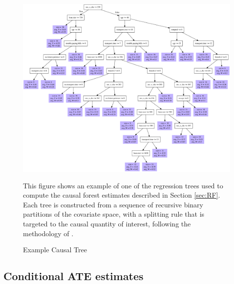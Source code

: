\vspace{.3in}
\begin{figure}[H]
        \caption{Example Causal Tree}
    \label{causal_tree1}
    \begin{center}
        \centering
        \includegraphics[width=\textwidth]{Figuras/crf_apr.pdf}
    \end{center}
    \footnotesize 
    This figure shows an example of one of the regression trees used to compute the causal forest estimates described in Section \ref{sec:RF}. Each tree is constructed from a sequence of recursive binary partitions of the covariate space, with a splitting rule that is targeted to the causal quantity of interest, following the methodology of \cite{atheygrf}.
\end{figure}

\newpage
\subsection{Conditional ATE estimates}

